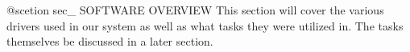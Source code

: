 @scetion sec\+\_ SOFTWARE OVERVIEW This section will cover the various drivers used in our system as well as what tasks they were utilized in. The tasks themselves be discussed in a later section. 